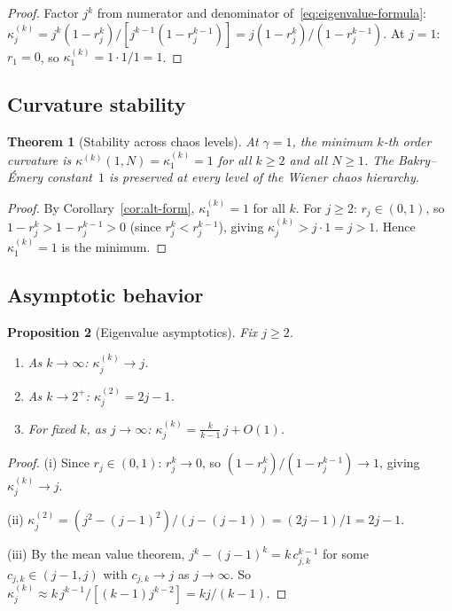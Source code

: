 \documentclass[11pt,a4paper]{article}
\theoremstyle{plain}
\newtheorem{theorem}{Theorem}[section]
\newtheorem{proposition}[theorem]{Proposition}
\theoremstyle{definition}
\theoremstyle{remark}
\begin{document}
\begin{proof}
Factor $j^k$ from numerator and denominator of~\eqref{eq:eigenvalue-formula}:
$\kappa_j^{(k)} = j^k(1 - r_j^k) / [j^{k-1}(1 - r_j^{k-1})]
= j(1 - r_j^k)/(1 - r_j^{k-1})$.
At $j = 1$: $r_1 = 0$, so $\kappa_1^{(k)} = 1 \cdot 1/1 = 1$.
\end{proof}


\subsection{Curvature stability}

\begin{theorem}[Stability across chaos levels]\label{thm:stability}
At $\gamma = 1$, the minimum $k$-th order curvature is
$\kappa^{(k)}(1,N) = \kappa_1^{(k)} = 1$ for all $k \geq 2$
and all $N \geq 1$. The Bakry--\'Emery constant~$1$ is
preserved at every level of the Wiener chaos hierarchy.
\end{theorem}

\begin{proof}
By Corollary~\ref{cor:alt-form},
$\kappa_1^{(k)} = 1$ for all $k$.
For $j \geq 2$: $r_j \in (0,1)$, so
$1 - r_j^k > 1 - r_j^{k-1} > 0$ (since $r_j^k < r_j^{k-1}$),
giving $\kappa_j^{(k)} > j \cdot 1 = j > 1$.
Hence $\kappa_1^{(k)} = 1$ is the minimum.
\end{proof}


\subsection{Asymptotic behavior}

\begin{proposition}[Eigenvalue asymptotics]\label{prop:asymptotics}
Fix $j \geq 2$.
\begin{enumerate}[label=(\roman*)]
\item As $k \to \infty$:
  $\kappa_j^{(k)} \to j$.
\item As $k \to 2^+$:
  $\kappa_j^{(2)} = 2j - 1$.
\item For fixed $k$, as $j \to \infty$:
  $\kappa_j^{(k)} = \frac{k}{k-1}\,j + O(1)$.
\end{enumerate}
\end{proposition}

\begin{proof}
(i) Since $r_j \in (0,1)$: $r_j^k \to 0$, so
$(1-r_j^k)/(1-r_j^{k-1}) \to 1$, giving $\kappa_j^{(k)} \to j$.

(ii) $\kappa_j^{(2)} = (j^2-(j-1)^2)/(j-(j-1)) = (2j-1)/1 = 2j-1$.

(iii) By the mean value theorem,
$j^k - (j-1)^k = k\,c_{j,k}^{k-1}$ for some
$c_{j,k} \in (j-1,j)$ with $c_{j,k} \to j$ as $j \to \infty$.
So $\kappa_j^{(k)} \approx k\,j^{k-1}/[(k-1)j^{k-2}] = kj/(k-1)$.
\end{proof}
\end{document}
